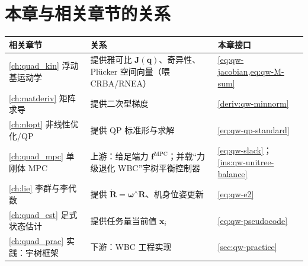 \section*{本章与相关章节的关系}
\begin{table}[H]\centering\small
\begin{tabular}{lll}
\toprule
相关章节 & 关系 & 本章接口 \\
\midrule
\cref{ch:quad_kin} 浮动基运动学 & 提供雅可比 $\boldsymbol{J}(\boldsymbol{q})$、奇异性、Plücker 空间向量（喂 CRBA/RNEA）& \cref{eq:qw-jacobian,eq:qw-M-sum} \\
\cref{ch:matderiv} 矩阵求导 & 提供二次型梯度 & \cref{deriv:qw-minnorm} \\
\cref{ch:nlopt} 非线性优化/QP & 提供 QP 标准形与求解 & \cref{eq:qw-qp-standard} \\
\cref{ch:quad_mpc} 单刚体 MPC & 上游：给足端力 $\boldsymbol{f}^{\mathrm{MPC}}$；并载“力级退化 WBC”宇树平衡控制器 & \cref{eq:qw-slack}；\cref{ins:qw-unitree-balance} \\
\cref{ch:lie} 李群与李代数 & 提供 $\dot{\mathbf{R}}=\boldsymbol{\omega}^\wedge\mathbf{R}$、机身位姿更新 & \cref{eq:qw-e2} \\
\cref{ch:quad_est} 足式状态估计 & 提供任务量当前值 $\boldsymbol{x}_i$ & \cref{eq:qw-pseudocode} \\
\cref{ch:quad_prac} 实践：宇树框架 & 下游：WBC 工程实现 & \cref{sec:qw-practice} \\
\bottomrule
\end{tabular}
\end{table}

